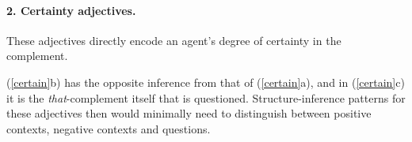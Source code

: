\documentclass[10pt]{article}
\begin{document}


\vspace{-.2in}
\paragraph{2. Certainty adjectives.} \hspace{-.1in}These adjectives directly encode an agent's degree of certainty in the complement.

\vspace{-0.5em}
 \vspace{-0.5em} 
(\ref{certain}b) has the opposite inference from that of
 (\ref{certain}a), and 
in (\ref{certain}c) it is the
 \textit{that}-complement itself that is questioned. 
Structure-inference patterns for these adjectives
 then would minimally need to distinguish between positive contexts, negative
 contexts and questions.
\end{document}
